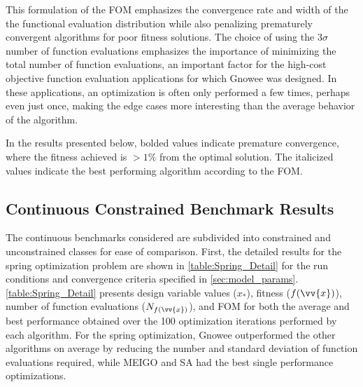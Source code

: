 \documentclass{article}                                                                           %
\begin{document}
This formulation of the FOM emphasizes the convergence rate and width of the the functional evaluation distribution while also penalizing prematurely convergent algorithms for poor fitness solutions.  
The choice of using the $3\sigma$ number of function evaluations emphasizes the importance of minimizing the total number of function evaluations, an important factor for the high-cost objective function evaluation applications for which Gnowee was designed.  
In these applications, an optimization is often only performed a few times, perhaps even just once, making the edge cases more interesting than the average behavior of the algorithm.    

In the results presented below, bolded values indicate premature convergence, where the fitness achieved is $> 1\%$ from the optimal solution.
The italicized values indicate the best performing algorithm according to the FOM.

\subsection{Continuous Constrained Benchmark Results} \label{sec:con_con_results}
The continuous benchmarks considered are subdivided into constrained and unconstrained classes for ease of comparison.  First, the detailed results for the spring optimization problem are shown in \autoref{table:Spring_Detail} for the run conditions and convergence criteria specified in \autoref{sec:model_params}.
\autoref{table:Spring_Detail} presents design variable values ($x_*$), fitness ($f(\vv{x})$), number of function evaluations ($N_{f(\vv{x})}$), and FOM for both the average and best performance obtained over the 100 optimization iterations performed by each algorithm. 
For the spring optimization, Gnowee outperformed the other algorithms on average by reducing the number and standard deviation of function evaluations required, while MEIGO and SA had the best single performance optimizations.    
\end{document}
